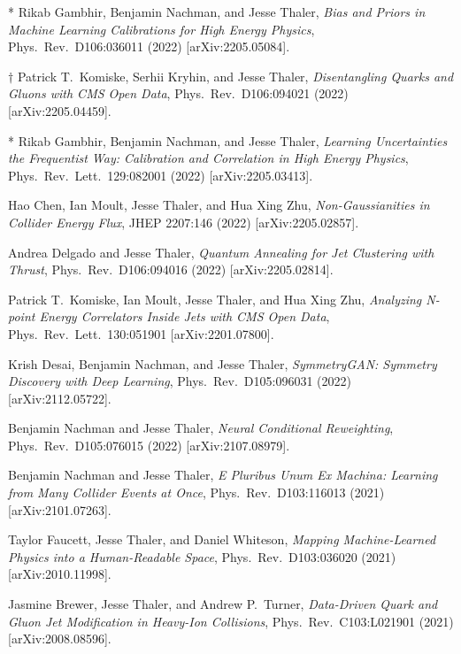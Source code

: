 \begin{list}{[]\addtocounter{jessecount}{-1}}{\leftmargin=3em \itemsep=4pt}
\item
* Rikab Gambhir, Benjamin Nachman, and Jesse Thaler,
\emph{Bias and Priors in Machine Learning Calibrations for High Energy Physics},
Phys.\ Rev.\ D106:036011 (2022)
[arXiv:2205.05084].

\item
$\dagger$ Patrick T.\ Komiske, Serhii Kryhin, and Jesse Thaler,
\emph{Disentangling Quarks and Gluons with CMS Open Data},
Phys.\ Rev.\ D106:094021 (2022)
[arXiv:2205.04459].

\item
* Rikab Gambhir, Benjamin Nachman, and Jesse Thaler,
\emph{Learning Uncertainties the Frequentist Way: Calibration and Correlation in High Energy Physics},
Phys.\ Rev.\ Lett.\ 129:082001 (2022)
[arXiv:2205.03413].

\item
 Hao Chen, Ian Moult, Jesse Thaler, and Hua Xing Zhu,
\emph{Non-Gaussianities in Collider Energy Flux},
JHEP 2207:146 (2022)
[arXiv:2205.02857].

\item
 Andrea Delgado and Jesse Thaler,
\emph{Quantum Annealing for Jet Clustering with Thrust},
Phys.\ Rev.\ D106:094016 (2022)
[arXiv:2205.02814].

\item
 Patrick T.\ Komiske, Ian Moult, Jesse Thaler, and Hua Xing Zhu,
\emph{Analyzing N-point Energy Correlators Inside Jets with CMS Open Data},
Phys.\ Rev.\ Lett.\ 130:051901
[arXiv:2201.07800].

\item
 Krish Desai, Benjamin Nachman, and Jesse Thaler,
\emph{SymmetryGAN: Symmetry Discovery with Deep Learning},
Phys.\ Rev.\ D105:096031 (2022)
[arXiv:2112.05722].

\item
 Benjamin Nachman and Jesse Thaler,
\emph{Neural Conditional Reweighting},
Phys.\ Rev.\ D105:076015 (2022)
[arXiv:2107.08979].

\item
 Benjamin Nachman and Jesse Thaler,
\emph{E Pluribus Unum Ex Machina: Learning from Many Collider Events at Once},
Phys.\ Rev.\ D103:116013 (2021)
[arXiv:2101.07263].

\item
 Taylor Faucett, Jesse Thaler, and Daniel Whiteson,
\emph{Mapping Machine-Learned Physics into a Human-Readable Space},
Phys.\ Rev.\ D103:036020 (2021)
[arXiv:2010.11998].

\item
 Jasmine Brewer, Jesse Thaler, and Andrew P.\ Turner,
\emph{Data-Driven Quark and Gluon Jet Modification in Heavy-Ion Collisions},
Phys.\ Rev.\ C103:L021901 (2021)
[arXiv:2008.08596].


\end{list}

